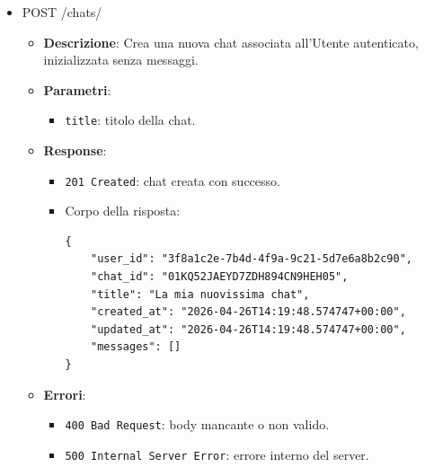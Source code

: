 \documentclass[a4paper,12pt]{article}
\newcommand{\code}[1]{{\ttfamily\textcolor{purple!85!black}{#1}}}
\begin{document}
\begin{itemize}
\begin{itemize}
            \item \textbf{Errori}:
            \begin{itemize}
                \item \texttt{400 Bad Request}: parametri mancanti o non validi.
                \item \texttt{401 Unauthorized}: Utente non autenticato.
                \item \texttt{500 Internal Server Error}: errore interno del server.
            \end{itemize}
        \end{itemize}

    \item \code{POST /chats/}
        \begin{itemize}
            \item \textbf{Descrizione}: Crea una nuova chat associata all’Utente autenticato, inizializzata senza messaggi.

            \item \textbf{Parametri}:
            \begin{itemize}
                \item \texttt{title}: titolo della chat.
            \end{itemize}

            \item \textbf{Response}:
            \begin{itemize}
                \item \texttt{201 Created}: chat creata con successo.
                \item Corpo della risposta:
\begin{verbatim}
{
    "user_id": "3f8a1c2e-7b4d-4f9a-9c21-5d7e6a8b2c90",
    "chat_id": "01KQ52JAEYD7ZDH894CN9HEH05",
    "title": "La mia nuovissima chat",
    "created_at": "2026-04-26T14:19:48.574747+00:00",
    "updated_at": "2026-04-26T14:19:48.574747+00:00",
    "messages": []
}
\end{verbatim}
            \end{itemize}

            \item \textbf{Errori}:
            \begin{itemize}
                \item \texttt{400 Bad Request}: body mancante o non valido.
                \item \texttt{500 Internal Server Error}: errore interno del server.
            \end{itemize}
        \end{itemize}


\end{itemize}
\end{document}

